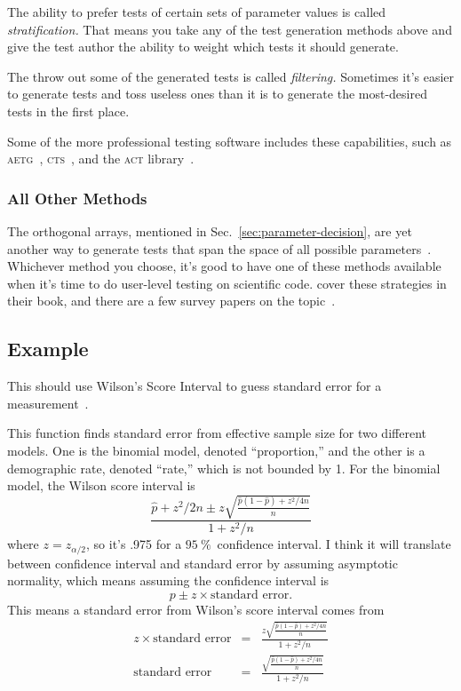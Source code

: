\documentclass[fleqn,10pt]{olplainarticle}
\begin{document}
The ability to prefer tests of certain sets of parameter values
is called \emph{stratification.} That means you take any
of the test generation methods above and give the test author
the ability to weight which tests it should generate.

The throw out some of the generated tests is called
\emph{filtering.} Sometimes it's easier to generate tests
and toss useless ones than it is to generate the most-desired
tests in the first place.

Some of the more professional testing software includes
these capabilities, such as \textsc{aetg}~\citep{cohen1997aetg},
\textsc{cts}~\citep{hartman2004problems},
and the \textsc{act} library~\citep{kuhn2008automated}.


\subsubsection{All Other Methods}
The orthogonal arrays, mentioned in Sec.~\ref{sec:parameter-decision},
are yet another way to generate tests that span the space of
all possible parameters~\citep{Owen1992}.
Whichever method you choose, it's
good to have one of these methods available when it's time to
do user-level testing on scientific code.
\citet{petke2015practical} cover these strategies in their book,
and there are a few survey papers on the topic~\citep{nie2011survey,khalsa2014orchestrated}.


\subsection{Example}\label{sec:parameter-wilson}
This should use Wilson's Score Interval to guess standard error for a measurement~\citep{agresti1998approximate}.

This function finds standard error from effective sample size for two
different models. One is the binomial model, denoted ``proportion,''
and the other is a demographic rate, denoted ``rate,'' which is not bounded
by 1. For the binomial model, the Wilson score interval is
\begin{equation}
    \frac{\hat{p}+z^2/2n\pm z\sqrt{\frac{\hat{p}(1-\hat{p})+z^2/4n}{n}}}{1+z^2/n}
\end{equation}
where $z=z_{\alpha/2}$, so it's .975 for a $95\:\%$~confidence interval.
I think it will translate between confidence interval and standard
error by assuming asymptotic normality, which means assuming the
confidence interval is
\begin{equation}
    p\pm z \times\mbox{standard error}.
\end{equation}
This means a standard error from Wilson's score interval comes from
\begin{eqnarray}
    z \times\mbox{standard error} & = & \frac{z\sqrt{\frac{\hat{p}(1-\hat{p})+z^2/4n}{n}}}{1+z^2/n} \\
    \mbox{standard error} & = & \frac{\sqrt{\frac{\hat{p}(1-\hat{p})+z^2/4n}{n}}}{1+z^2/n}
\end{eqnarray}
\end{document}
